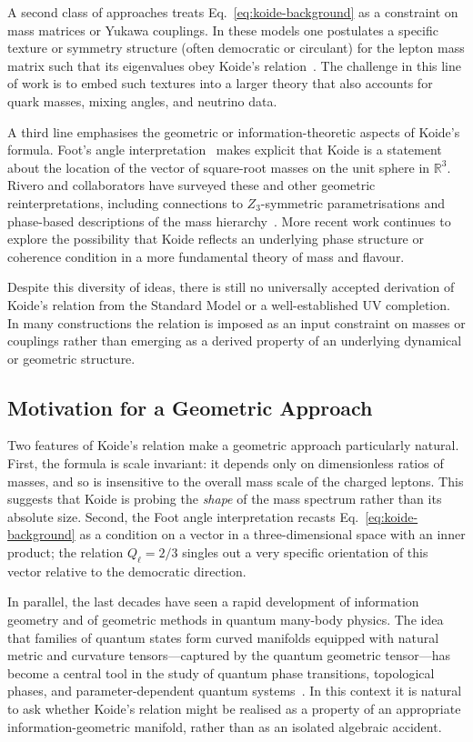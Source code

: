 \documentclass[12pt]{article}
\begin{document}
A second class of approaches treats Eq.~\eqref{eq:koide-background} as a
constraint on mass matrices or Yukawa couplings.  In these models one
postulates a specific texture or symmetry structure (often democratic or
circulant) for the lepton mass matrix such that its eigenvalues obey Koide's
relation~\cite{Brannen2006,Sumino2009}.  The challenge in this line of work is
to embed such textures into a larger theory that also accounts for quark
masses, mixing angles, and neutrino data.

A third line emphasises the geometric or information-theoretic aspects of
Koide's formula.  Foot's angle interpretation~\cite{Foot1994} makes explicit
that Koide is a statement about the location of the vector of square-root
masses on the unit sphere in $\mathbb{R}^3$.  Rivero and collaborators have
surveyed these and other geometric reinterpretations, including connections to
$Z_3$-symmetric parametrisations and phase-based descriptions of the mass
hierarchy~\cite{RiveroStrangeFormula,RiveroKoideReview}.  More recent work
continues to explore the possibility that Koide reflects an underlying phase
structure or coherence condition in a more fundamental theory of mass and
flavour.

Despite this diversity of ideas, there is still no universally accepted
derivation of Koide's relation from the Standard Model or a well-established
UV completion.  In many constructions the relation is imposed as an input
constraint on masses or couplings rather than emerging as a derived property of
an underlying dynamical or geometric structure.

\subsection{Motivation for a Geometric Approach}

Two features of Koide's relation make a geometric approach particularly
natural.  First, the formula is scale invariant: it depends only on dimensionless ratios of masses, and so is insensitive to the overall mass scale of
the charged leptons.  This suggests that Koide is probing the \emph{shape} of
the mass spectrum rather than its absolute size.  Second, the Foot angle
interpretation recasts Eq.~\eqref{eq:koide-background} as a condition on a
vector in a three-dimensional space with an inner product; the relation
$Q_\ell = 2/3$ singles out a very specific orientation of this vector relative
to the democratic direction.

In parallel, the last decades have seen a rapid development of information
geometry and of geometric methods in quantum many-body physics.  The idea that
families of quantum states form curved manifolds equipped with natural metric
and curvature tensors---captured by the quantum geometric tensor---has become
a central tool in the study of quantum phase transitions, topological phases,
and parameter-dependent quantum systems~\cite{ProvostVallee1980,Zanardi2007,InformationGeometryReview}.  In this context it is natural to ask
whether Koide's relation might be realised as a property of an appropriate
information-geometric manifold, rather than as an isolated algebraic accident.
\end{document}
